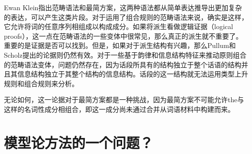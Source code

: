 Ewan Klein指出范畴语法\indexcgc 和最简方案，这两种语法都从简单表达推导出更加复杂的表达，可以产生这类片段\citep[]{Pullum2013a}。对于运用了组合规则的范畴语法来说，确实是这样，它允许将词的任意序列相组成以构成成分。如果将派生看做逻辑证据（logical proofs），这一点在范畴语法的一些变体中很常见，那么真正的派生就不重要了。重要的是证据是否可以找到。但是，如果对于派生结构有兴趣，那么Pullum和Scholz提出的论据则仍然有效。对于一些基于韵律和信息结构特征来推动原则组合的范畴语法变体\citep[\S~3]{Steedman91a}，问题仍然存在，因为话段所具有的结构独立于整个话语的结构并且其信息结构独立于其整个结构的信息结构。话段的这一结构就无法运用类型上升规则和组合规则来分析。

无论如何，这一论据对于最简方案都是一种挑战，因为最简方案不可能允许the与这样的名词性成分相组合，即这一成分尚未通过合并从词语材料中构建而来。

\section{模型论方法的一个问题？}
\label{Abschnitt-MTS-ten-Hacken}

